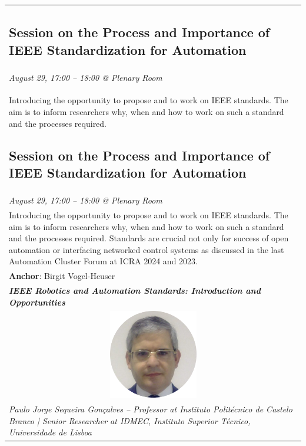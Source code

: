 \documentclass[
	openany, %
	parskip=full, %
	12pt, %
	a4paper, %
]{conferencebooklet} %
\begin{document}
\begin{multicols*}{2}
\begin{tabular}{p{75mm}}
            \parbox{75mm}{\subsection*{Session on the Process and Importance of IEEE Standardization for Automation}} \\
            \textit{August 29, 17:00 – 18:00 @  Plenary Room} \vspace{2mm} \\
            Introducing the opportunity to propose and to work on IEEE standards. The aim is to inform researchers why, when and how to work on such a standard and the processes required.
            \parbox{75mm}{\subsection*{Session on the Process and Importance of IEEE Standardization for Automation}} \\
            \textit{August 29, 17:00 – 18:00 @  Plenary Room} \vspace{2mm} \\
            Introducing the opportunity to propose and to work on IEEE standards. The aim is to inform researchers why, when and how to work on such a standard and the processes required.
            Standards are crucial not only for success of open automation or interfacing networked control systems as discussed in the last Automation Cluster Forum at ICRA 2024 and 2023. \vspace{2mm} \\
            \textbf{Anchor}: Birgit Vogel-Heuser \vspace{2mm} \\
            \textit{\textbf{IEEE Robotics and Automation Standards: Introduction and Opportunities}} \vspace{2mm} \\
             \vspace{2mm} \\
            \textit{Paulo Jorge Sequeira Gonçalves -- Professor at Instituto Politécnico de Castelo Branco | Senior Researcher at IDMEC, Instituto Superior Técnico, Universidade de Lisboa}
        \end{tabular}


\end{multicols*}
\end{document}
